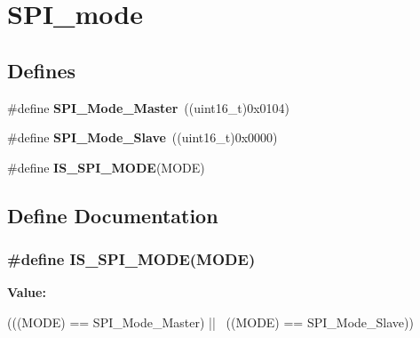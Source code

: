 \hypertarget{group__SPI__mode}{
\section{SPI\_\-mode}
\label{group__SPI__mode}
}
\subsection*{Defines}
\begin{DoxyCompactItemize}
\item 
\hypertarget{group__SPI__mode_gaa9e47fb7c1d6c4655b72a00ed1f3b651}{
\#define {\bfseries SPI\_\-Mode\_\-Master}~((uint16\_\-t)0x0104)}
\label{group__SPI__mode_gaa9e47fb7c1d6c4655b72a00ed1f3b651}

\item 
\hypertarget{group__SPI__mode_ga84621141413ee07cb2d2dc82da2baa42}{
\#define {\bfseries SPI\_\-Mode\_\-Slave}~((uint16\_\-t)0x0000)}
\label{group__SPI__mode_ga84621141413ee07cb2d2dc82da2baa42}

\item 
\#define {\bfseries IS\_\-SPI\_\-MODE}(MODE)
\end{DoxyCompactItemize}


\subsection{Define Documentation}
\hypertarget{group__SPI__mode_gad5135300763c75dbb446861536359f12}{
\subsubsection[{IS\_\-SPI\_\-MODE}]{\setlength{\rightskip}{0pt plus 5cm}\#define IS\_\-SPI\_\-MODE(MODE)}}
\label{group__SPI__mode_gad5135300763c75dbb446861536359f12}
{\bfseries Value:}
\begin{DoxyCode}
(((MODE) == SPI_Mode_Master) || \
                           ((MODE) == SPI_Mode_Slave))
\end{DoxyCode}
